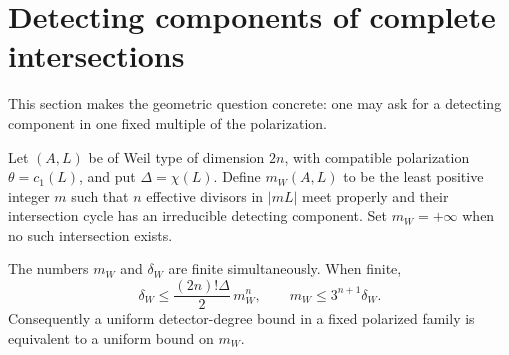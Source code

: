 \section{Detecting components of complete intersections}
\label{sec:complete-intersections}
This section makes the geometric question concrete: one may ask for a detecting component in one fixed multiple of the polarization.

Let $(A,L)$ be of Weil type of dimension $2n$, with compatible polarization $\theta=c_1(L)$, and put $\Delta=\chi(L)$. Define $m_W(A,L)$ to be the least positive integer $m$ such that $n$ effective divisors in $|mL|$ meet properly and their intersection cycle has an irreducible detecting component. Set $m_W=+\infty$ when no such intersection exists.

\begin{proposition}\label{prop:complete-intersections}
The numbers $m_W$ and $\delta_W$ are finite simultaneously. When finite,
\[
 \delta_W\leq\frac{(2n)!\Delta}{2}\,m_W^n,
 \qquad m_W\leq3^{n+1}\delta_W.
\]
Consequently a uniform detector-degree bound in a fixed polarized family is equivalent to a uniform bound on $m_W$.
\end{proposition}

